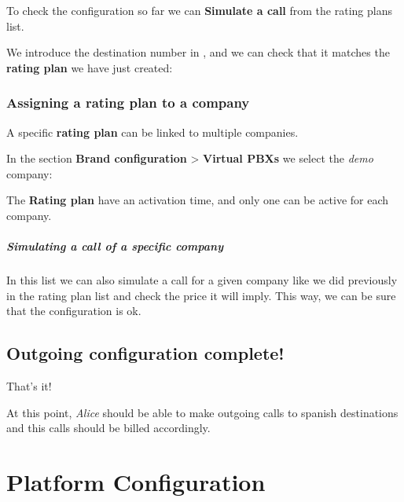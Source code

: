 \documentclass[letterpaper,10pt,english]{sphinxmanual}
\begin{document}
To check the configuration so far we can \textbf{Simulate a call} from the rating plans list.

We introduce the destination number in {\hyperref[brand/transformations/index:e164]{}}, and we can check that it matches
the \textbf{rating plan} we have just created:

\noindent{}


\subsection{Assigning a rating plan to a company}
\label{brand/billing/rating_plans:assigning-a-rating-plan-to-a-company}
A specific \textbf{rating plan} can be linked to multiple companies.

In the section \textbf{Brand configuration} \textgreater{} \textbf{Virtual PBXs} we select the \emph{demo}
company:

\noindent{}

The \textbf{Rating plan} have an activation time, and only one can be active for each
company.

\noindent{}
\paragraph{Simulating a call of a specific company}

In this list we can also simulate a call for a given company like we did previously
in the rating plan list and check the price it will imply. This way, we can be sure
that the configuration is ok.


\section{Outgoing configuration complete!}
\label{getting_started/external_outgoing_calls/finish:outgoing-configuration-complete}\label{getting_started/external_outgoing_calls/finish::doc}
That's it!

At this point, \emph{Alice} should be able to make outgoing calls to
spanish destinations and this calls should be billed accordingly.


\chapter{Platform Configuration}
\label{platform/index::doc}\label{platform/index:platform-configuration}
\end{document}

